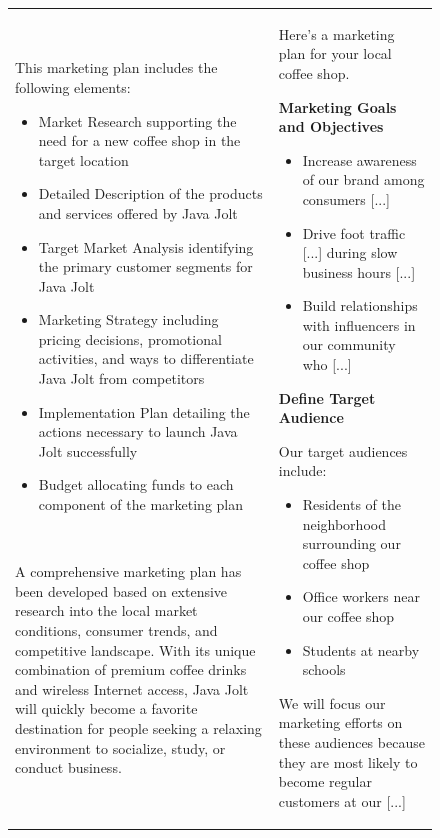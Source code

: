 \documentclass{article}
\begin{document}
\begin{figure}[p]
\begin{tabular}{@{}p{}p{}@{}}
    This marketing plan includes the following elements:
    \begin{itemize}[leftmargin=8pt]
    \item Market Research supporting the need for a new coffee shop in the target location
    \item Detailed Description of the products and services offered by Java Jolt
    \item Target Market Analysis identifying the primary customer segments for Java Jolt
    \item Marketing Strategy including pricing decisions, promotional activities, and ways to differentiate Java Jolt from competitors
    \item Implementation Plan detailing the actions necessary to launch Java Jolt successfully
    \item Budget allocating funds to each component of the marketing plan
    \end{itemize}

    ~

    A comprehensive marketing plan has been developed based on extensive research into the local market conditions, consumer trends, and competitive landscape. With its unique combination of premium coffee drinks and wireless Internet access, Java Jolt will quickly become a favorite destination for people seeking a relaxing environment to socialize, study, or conduct business.
    
    &    
    Here's a marketing plan for your local coffee shop.
    ~
    
    \textbf{Marketing Goals and Objectives}
    \begin{itemize}[leftmargin=8pt]
        \item Increase awareness of our brand among consumers \textcolor[HTML]{808080}{[...]}
        \item Drive foot traffic \textcolor[HTML]{808080}{[...]} during slow business hours \textcolor[HTML]{808080}{[...]}
        \item Build relationships with influencers in our community who \textcolor[HTML]{808080}{[...]}
    \end{itemize}
    
    \textbf{Define Target Audience}
    ~
    
    Our target audiences include:
    \begin{itemize}[leftmargin=8pt]
        \item Residents of the neighborhood surrounding our coffee shop
        \item Office workers near our coffee shop
        \item Students at nearby schools
    \end{itemize}
We will focus our marketing efforts on these audiences because they are most likely to become regular customers at our \textcolor[HTML]{808080}{[...]}
    ~
    

\end{tabular}
\end{figure}
\end{document}
